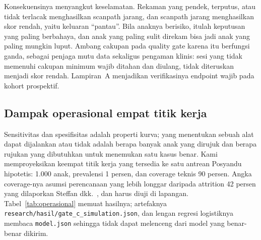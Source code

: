 \documentclass{article}
\begin{document}
Konsekuensinya menyangkut keselamatan. Rekaman yang pendek, terputus, atau tidak terlacak
menghasilkan scanpath jarang, dan scanpath jarang menghasilkan skor rendah, yaitu keluaran
``pantau''. Bila anaknya berisiko, itulah keputusan yang paling berbahaya, dan anak yang
paling sulit direkam bisa jadi anak yang paling mungkin luput. Ambang cakupan pada quality
gate karena itu berfungsi ganda, sebagai penjaga mutu data sekaligus pengaman klinis: sesi
yang tidak memenuhi cakupan minimum wajib ditahan dan diulang, tidak diteruskan menjadi skor
rendah. Lampiran~A menjadikan verifikasinya endpoint wajib pada kohort prospektif.

\subsection{Dampak operasional empat titik kerja}
\label{sec:operasional}

Sensitivitas dan spesifisitas adalah properti kurva; yang menentukan sebuah alat dapat
dijalankan atau tidak adalah berapa banyak anak yang dirujuk dan berapa rujukan yang
dibutuhkan untuk menemukan satu kasus benar. Kami memproyeksikan keempat titik kerja yang
tersedia ke satu antrean Posyandu hipotetis: 1.000 anak, prevalensi 1 persen, dan coverage
teknis 90 persen. Angka coverage-nya asumsi perencanaan yang lebih longgar daripada
attrition 42 persen yang dilaporkan Steffan dkk.~\cite{steffan2024}, dan harus diuji di
lapangan. Tabel~\ref{tab:operasional} memuat hasilnya; artefaknya
\texttt{research/hasil/gate\_c\_simulation.json}, dan lengan regresi logistiknya membaca
\texttt{model.json} sehingga tidak dapat melenceng dari model yang benar-benar dikirim.
\end{document}
